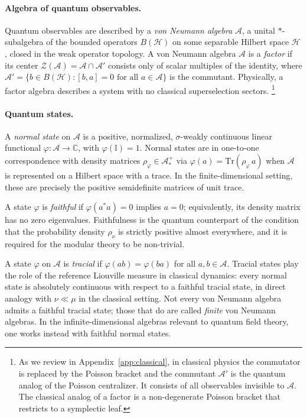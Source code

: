\documentclass[a4paper,11pt]{article}
\theoremstyle{definition}
\theoremstyle{remark}
\newcommand{\id}{\mathbb{I}}
\newcommand{\Tr}{\text{Tr}}
\begin{document}
\paragraph{Algebra of quantum observables.}
Quantum observables are described by a \emph{von Neumann algebra} $\mathcal{A}$, a
unital $*$-subalgebra of the bounded operators $B(\mathcal{H})$ on some separable
Hilbert space $\mathcal{H}$, closed in the weak operator topology.  A von Neumann
algebra $\mathcal{A}$ is a \emph{factor} if its center
$\mathcal{Z}(\mathcal{A}) = \mathcal{A}\cap\mathcal{A}'$ consists only of scalar
multiples of the identity, where
$\mathcal{A}' = \{b\in B(\mathcal{H}) : [b,a]=0\text{ for all }a\in\mathcal{A}\}$ is
the commutant.  Physically, a factor algebra describes a system with no classical
superselection sectors.%
\footnote{As we review in Appendix~\ref{app:classical}, in classical physics the
  commutator is replaced by the Poisson bracket and the commutant $\mathcal{A}'$ is
  the quantum analog of the Poisson centralizer.  It consists of all observables
  invisible to $\mathcal{A}$.  The classical analog of a factor is a non-degenerate
  Poisson bracket that restricts to a symplectic leaf.}
 
\paragraph{Quantum states.}
A \emph{normal state} on $\mathcal{A}$ is a positive, normalized,
$\sigma$-weakly continuous linear functional
$\varphi:\mathcal{A}\to\mathbb{C}$, with $\varphi(\id)=1$.  Normal states are in
one-to-one correspondence with density matrices $\rho_\varphi\in\mathcal{A}_*^+$ via
$\varphi(a)=\Tr(\rho_\varphi\, a)$ when $\mathcal{A}$ is represented on a Hilbert
space with a trace.  In the finite-dimensional setting, these are precisely the
positive semidefinite matrices of unit trace.
 
A state $\varphi$ is \emph{faithful} if $\varphi(a^*a)=0$ implies $a=0$;
equivalently, its density matrix has no zero eigenvalues.  Faithfulness is the quantum
counterpart of the condition that the probability density $\rho_\nu$ is strictly
positive almost everywhere, and it is required for the modular theory to be
non-trivial.
 
A state $\varphi$ on $\mathcal{A}$ is \emph{tracial} if $\varphi(ab)=\varphi(ba)$ for
all $a,b\in\mathcal{A}$.  Tracial states play the role of the reference Liouville
measure in classical dynamics: every normal state is absolutely continuous with
respect to a faithful tracial state, in direct analogy with $\nu\ll\mu$ in the
classical setting.  Not every von Neumann algebra admits a faithful tracial state;
those that do are called \emph{finite} von Neumann algebras.  In the
infinite-dimensional algebras relevant to quantum field theory, one works instead with
faithful normal states.
 
\end{document}
